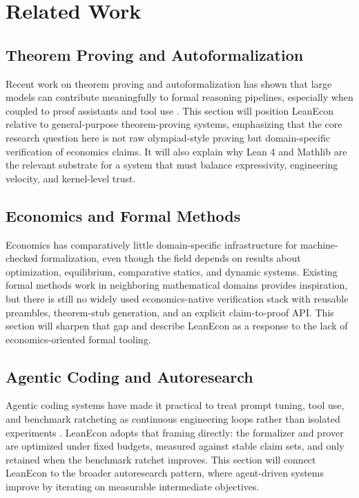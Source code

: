 \documentclass[11pt,letterpaper]{article}
\begin{document}
\section{Related Work}

\subsection{Theorem Proving and Autoformalization}

Recent work on theorem proving and autoformalization has shown that large models can contribute meaningfully to formal reasoning pipelines, especially when coupled to proof assistants and tool use \citep{alphaproof,dsp,proveragent,lean4,mathlib}. This section will position LeanEcon relative to general-purpose theorem-proving systems, emphasizing that the core research question here is not raw olympiad-style proving but domain-specific verification of economics claims. It will also explain why Lean 4 and Mathlib are the relevant substrate for a system that must balance expressivity, engineering velocity, and kernel-level trust.

\subsection{Economics and Formal Methods}

Economics has comparatively little domain-specific infrastructure for machine-checked formalization, even though the field depends on results about optimization, equilibrium, comparative statics, and dynamic systems. Existing formal methods work in neighboring mathematical domains provides inspiration, but there is still no widely used economics-native verification stack with reusable preambles, theorem-stub generation, and an explicit claim-to-proof API. This section will sharpen that gap and describe LeanEcon as a response to the lack of economics-oriented formal tooling.

\subsection{Agentic Coding and Autoresearch}

Agentic coding systems have made it practical to treat prompt tuning, tool use, and benchmark ratcheting as continuous engineering loops rather than isolated experiments \citep{karpathy_autoresearch}. LeanEcon adopts that framing directly: the formalizer and prover are optimized under fixed budgets, measured against stable claim sets, and only retained when the benchmark ratchet improves. This section will connect LeanEcon to the broader autoresearch pattern, where agent-driven systems improve by iterating on measurable intermediate objectives.
\end{document}
